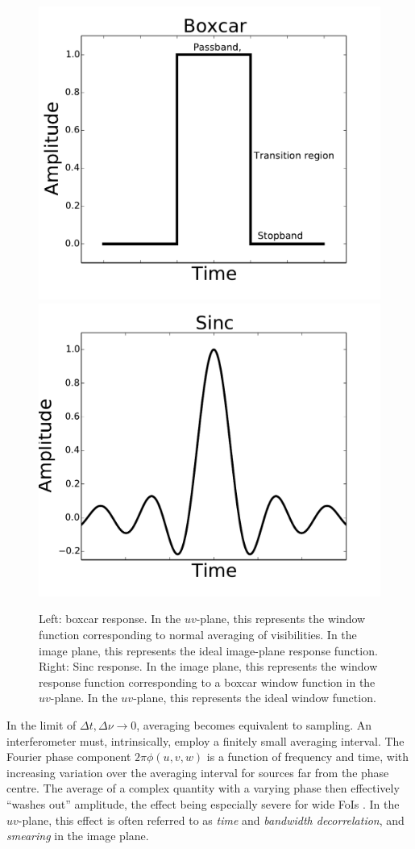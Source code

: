\documentclass[useAMS,usenatbib]{mn2e}
\begin{document}
\begin{figure}
\includegraphics[width=.4\textwidth]{./Figures/idealIPRgrey.pdf}%
\includegraphics[width=.4\textwidth]{./Figures/idealsincgrey.pdf}\\
\caption{Left: boxcar response. In the $uv$-plane, this represents the window function corresponding to normal
averaging of visibilities. In the image plane, this represents the ideal image-plane response function. Right: 
Sinc response. In the image plane, this represents the window response function corresponding to a boxcar window function in 
the $uv$-plane. In the $uv$-plane, this represents the ideal window function.}
\label{fig:idealwindowfunction}
\end{figure}

In the limit of $\Delta t,\Delta \nu \rightarrow 0$, averaging becomes equivalent to sampling. 
An interferometer must, intrinsically, employ a finitely small averaging interval. The Fourier phase 
component $2\pi\phi(u,v,w)$ is a function of frequency and time, with increasing variation over the averaging interval 
for sources far from the phase centre. The average of a complex quantity with a varying phase then effectively ``washes out'' 
amplitude, the effect being especially severe for wide FoIs \citep[for an extensive discussion, see][]{bregman2012system}. In the
$uv$-plane, this
effect is often referred to as \emph{time} and \emph{bandwidth decorrelation}, and \emph{smearing} in the image plane.
\end{document}
